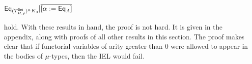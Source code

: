 \documentclass[runningheads]{llncs}
\newcommand{\set}{\mathsf{Set}}
\begin{document}

\noindent
$\Eq_{(T^\set_{H,\rho})^n K_0}] \overline{[\alpha := \Eq_A]}$
\begin{comment}
\[\begin{array}{ll}
&  \relsem{\Gamma; \Phi, \phi, \ol{\alpha} \vdash J} \Eq_{\rho} [\phi
  := T^{n}_{H,\Eq_{\rho}} K_0] \overline{[\alpha := \Eq_A]}\\
=  &
\relsem{\Gamma; \Phi, \phi,
  \ol{\alpha} \vdash J} \Eq_{\rho} [\phi := \Eq_{(T^\set_{H,\rho})^n K_0}]
\overline{[\alpha := \Eq_A]}
\end{array}\]
\end{comment}
hold. With these results in hand, the proof is not hard.  {\color{red}
  It is given in the appendix, along with proofs of all other results
  in this section.}  The proof makes clear that if functorial
variables of arity greater than $0$ were allowed to appear in the
bodies of $\mu$-types, then the IEL would fail.  
\end{document}
